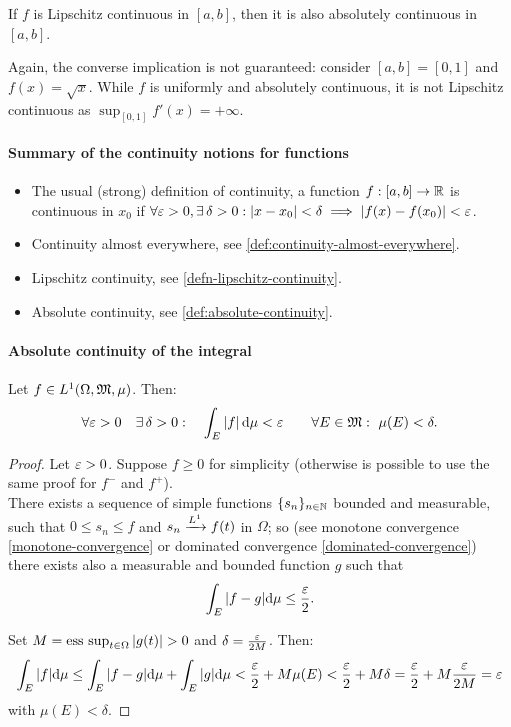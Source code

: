 \begin{prop}
	If $f$ is Lipschitz continuous in $[a,b]$, then it is also absolutely continuous in $[a,b]$.
\end{prop}

Again, the converse implication is not guaranteed: consider $[a,b] = [0,1]$ and $f(x)=\sqrt{x}$. While $f$ is uniformly and absolutely continuous, it is not Lipschitz continuous as $\sup_{[0,1]}f'(x)=+\infty$.

\paragraph{Summary of the continuity notions for functions} 
\begin{itemize}
	\item The usual (strong) definition of continuity, a function $f:[a,b]\to \mathbb R$ is continuous in $x_0$ if $\forall \varepsilon > 0, \exists\, \delta > 0 : |x-x_{0}|<\delta \implies |f(x)-f(x_0)|<\varepsilon$.
	\item Continuity almost everywhere, see \vref{def:continuity-almost-everywhere}.
	\item Lipschitz continuity, see \vref{defn-lipschitz-continuity}.
	\item Absolute continuity, see \vref{def:absolute-continuity}.
\end{itemize}

\paragraph{Absolute continuity of the integral}

\begin{theo} \label{theo-abs-continuity-int}
	Let $f\in L^1(\Omega, \mathfrak M, \mu)$. Then:
	$$\forall \eps > 0 \quad \exists\, \delta > 0 : \quad \int_E |f| \,\de\mu < \eps \qquad \forall E \in \mm : \ \mu(E) < \delta.$$
\end{theo}
\begin{proof}
	Let $\varepsilon >0$. Suppose $f\geq 0$ for simplicity (otherwise is possible to use the same proof for $f^-$ and $f^+$).\\
	There exists a sequence of simple functions $\{s_n\}_{n \in \mathbb N}$ bounded and measurable, such that $0\leq s_n \leq f$ and $s_n \xrightarrow{L^{1}} f(t)$ in $\Omega$; so (see monotone convergence \vref{monotone-convergence} or dominated convergence \vref{dominated-convergence}) there exists also a measurable and bounded function $g$ such that $$\int_E |f-g| \mathrm d \mu \leq \frac {\varepsilon} 2.$$
	
	Set $M=\esssup_{t\in \Omega}|g(t)|>0$ and $\delta=\frac{\varepsilon}{2M}$. Then:
	$$
		\int_E |f| \mathrm d \mu 
		\leq \int_E |f-g| \mathrm d \mu + \int_E |g| \mathrm d \mu 
		< \frac{\varepsilon}{2} + M\mu(E)
		< \frac{\varepsilon}{2} + M\delta
		= \frac{\varepsilon}{2} + M\frac{\varepsilon}{2M}
		= \varepsilon
	$$
	with $\mu(E) < \delta$.
\end{proof}

